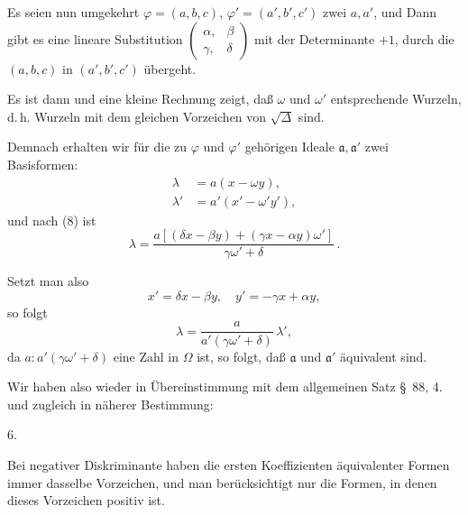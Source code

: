 

Es seien nun umgekehrt $\varphi = (a, b, c)$, $\varphi' = (a', b', c')$ zwei
 $a, a'$, und
Dann gibt es eine lineare Substitution $\begin{pmatrix} \alpha, & \beta \\ \gamma, & \delta \end{pmatrix}$ mit der Determinante $+1$, durch die $(a, b, c)$ in $(a', b', c')$ übergeht.

Es ist dann
und eine kleine Rechnung zeigt, daß $\omega$ und $\omega'$ entsprechende Wurzeln, d.\,h. Wurzeln mit dem gleichen Vorzeichen von $\sqrt{\Delta}$ sind.

Demnach erhalten wir für die zu $\varphi$ und $\varphi'$ gehörigen Ideale $\mathfrak{a}, \mathfrak{a}'$ zwei Basisformen:
\[
\begin{aligned}
\lambda &= a(x - \omega y),\\
\lambda' &= a'(x' - \omega'y'),
\end{aligned}
\]
und nach (8) ist
\[
\lambda = \frac{a[(\delta x - \beta y) + (\gamma x - \alpha y)\omega']}{\gamma\omega' + \delta}\,.
\]

Setzt man also
\[
x' = \delta x - \beta y, \quad y' = -\gamma x + \alpha y,
\]
so folgt
\[
\lambda = \frac{a}{a'(\gamma\omega' + \delta)}\,\lambda',
\]
da $a : a'(\gamma\omega' + \delta)$ eine Zahl in $\Omega$ ist, so folgt, daß $\mathfrak{a}$ und $\mathfrak{a}'$ äquivalent sind.

Wir haben also wieder in Übereinstimmung mit dem allgemeinen Satz \S\ 88, 4. und zugleich in näherer Bestimmung:

6. 

Bei negativer Diskriminante haben die ersten Koeffizienten äquivalenter Formen immer dasselbe Vorzeichen, und man berücksichtigt nur die Formen, in denen dieses Vorzeichen positiv ist.
